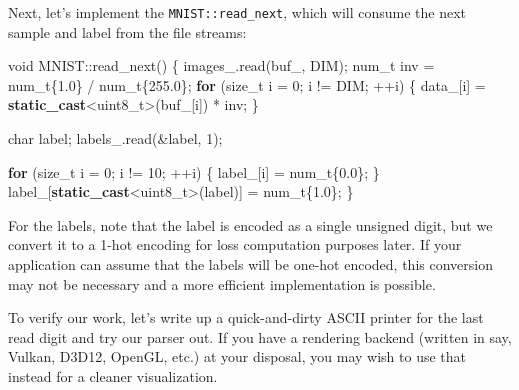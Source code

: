 \documentclass[
]{article}
\newenvironment{Shaded}{}{}
\newcommand{\ControlFlowTok}[1]{\textcolor[rgb]{0.00,0.44,0.13}{\textbf{#1}}}
\newcommand{\DataTypeTok}[1]{\textcolor[rgb]{0.56,0.13,0.00}{#1}}
\newcommand{\DecValTok}[1]{\textcolor[rgb]{0.25,0.63,0.44}{#1}}
\newcommand{\FloatTok}[1]{\textcolor[rgb]{0.25,0.63,0.44}{#1}}
\newcommand{\KeywordTok}[1]{\textcolor[rgb]{0.00,0.44,0.13}{\textbf{#1}}}
\newcommand{\NormalTok}[1]{#1}
\newcommand{\VariableTok}[1]{\textcolor[rgb]{0.10,0.09,0.49}{#1}}
\begin{document}
Next, let's implement the \texttt{MNIST::read\_next}, which will consume
the next sample and label from the file streams:

\begin{Shaded}
\begin{Highlighting}[]
\DataTypeTok{void}\NormalTok{ MNIST::read\_next()}
\NormalTok{\{}
    \VariableTok{images\_}\NormalTok{.read(}\VariableTok{buf\_}\NormalTok{, DIM);}
    \DataTypeTok{num\_t}\NormalTok{ inv = }\DataTypeTok{num\_t}\NormalTok{\{}\FloatTok{1.0}\NormalTok{\} / }\DataTypeTok{num\_t}\NormalTok{\{}\FloatTok{255.0}\NormalTok{\};}
    \ControlFlowTok{for}\NormalTok{ (}\DataTypeTok{size\_t}\NormalTok{ i = }\DecValTok{0}\NormalTok{; i != DIM; ++i)}
\NormalTok{    \{}
        \VariableTok{data\_}\NormalTok{[i] = }\KeywordTok{static\_cast}\NormalTok{\textless{}}\DataTypeTok{uint8\_t}\NormalTok{\textgreater{}(}\VariableTok{buf\_}\NormalTok{[i]) * inv;}
\NormalTok{    \}}

    \DataTypeTok{char}\NormalTok{ label;}
    \VariableTok{labels\_}\NormalTok{.read(\&label, }\DecValTok{1}\NormalTok{);}

    \ControlFlowTok{for}\NormalTok{ (}\DataTypeTok{size\_t}\NormalTok{ i = }\DecValTok{0}\NormalTok{; i != }\DecValTok{10}\NormalTok{; ++i)}
\NormalTok{    \{}
        \VariableTok{label\_}\NormalTok{[i] = }\DataTypeTok{num\_t}\NormalTok{\{}\FloatTok{0.0}\NormalTok{\};}
\NormalTok{    \}}
    \VariableTok{label\_}\NormalTok{[}\KeywordTok{static\_cast}\NormalTok{\textless{}}\DataTypeTok{uint8\_t}\NormalTok{\textgreater{}(label)] = }\DataTypeTok{num\_t}\NormalTok{\{}\FloatTok{1.0}\NormalTok{\};}
\NormalTok{\}}
\end{Highlighting}
\end{Shaded}

For the labels, note that the label is encoded as a single unsigned
digit, but we convert it to a 1-hot encoding for loss computation
purposes later. If your application can assume that the labels will be
one-hot encoded, this conversion may not be necessary and a more
efficient implementation is possible.

To verify our work, let's write up a quick-and-dirty ASCII printer for
the last read digit and try our parser out. If you have a rendering
backend (written in say, Vulkan, D3D12, OpenGL, etc.) at your disposal,
you may wish to use that instead for a cleaner visualization.
\end{document}
